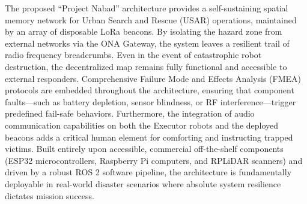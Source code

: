\documentclass[10pt, letterpaper]{article}
\begin{document}
The proposed ``Project Nabad'' architecture provides a self-sustaining spatial memory network for Urban Search and Rescue (USAR) operations, maintained by an array of disposable LoRa beacons. By isolating the hazard zone from external networks via the ONA Gateway, the system leaves a resilient trail of radio frequency breadcrumbs. Even in the event of catastrophic robot destruction, the decentralized map remains fully functional and accessible to external responders. Comprehensive Failure Mode and Effects Analysis (FMEA) protocols are embedded throughout the architecture, ensuring that component faults---such as battery depletion, sensor blindness, or RF interference---trigger predefined fail-safe behaviors. Furthermore, the integration of audio communication capabilities on both the Executor robots and the deployed beacons adds a critical human element for comforting and instructing trapped victims. Built entirely upon accessible, commercial off-the-shelf components (ESP32 microcontrollers, Raspberry Pi computers, and RPLiDAR scanners) and driven by a robust ROS 2 software pipeline, the architecture is fundamentally deployable in real-world disaster scenarios where absolute system resilience dictates mission success.
\end{document}
